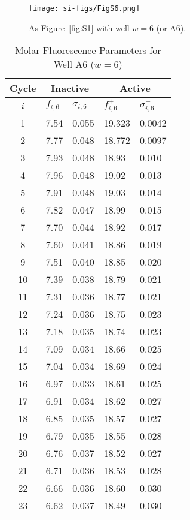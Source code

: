                 \begin{figure}
                    \centering
                    \texttt{[image: si-figs/FigS6.png]}
                    \caption{
                        As Figure~\ref{fig:S1} with well $w=6$ (or A6).
                    }
                \end{figure}
                \clearpage
    \begin{table}
        \caption{Molar Fluorescence Parameters for Well A6 ($w=6$)}
        \centering
        \begin{tabular}{c|ll|ll}
            Cycle & \multicolumn{2}{c|}{Inactive} & \multicolumn{2}{c}{Active} \\
            \hline
            $i$ & $f_{i,6}^{-}$ & $\sigma_{i,6}^{-}$ &  $f_{i,6}^{+}$ & $\sigma_{i,6}^{+}$ \\
            \hline
    1 & 7.54 & 0.055 & 19.323 & 0.0042 \\
2 & 7.77 & 0.048 & 18.772 & 0.0097 \\
3 & 7.93 & 0.048 & 18.93 & 0.010 \\
4 & 7.96 & 0.048 & 19.02 & 0.013 \\
5 & 7.91 & 0.048 & 19.03 & 0.014 \\
6 & 7.82 & 0.047 & 18.99 & 0.015 \\
7 & 7.70 & 0.044 & 18.92 & 0.017 \\
8 & 7.60 & 0.041 & 18.86 & 0.019 \\
9 & 7.51 & 0.040 & 18.85 & 0.020 \\
10 & 7.39 & 0.038 & 18.79 & 0.021 \\
11 & 7.31 & 0.036 & 18.77 & 0.021 \\
12 & 7.24 & 0.036 & 18.75 & 0.023 \\
13 & 7.18 & 0.035 & 18.74 & 0.023 \\
14 & 7.09 & 0.034 & 18.66 & 0.025 \\
15 & 7.04 & 0.034 & 18.69 & 0.024 \\
16 & 6.97 & 0.033 & 18.61 & 0.025 \\
17 & 6.91 & 0.034 & 18.62 & 0.027 \\
18 & 6.85 & 0.035 & 18.57 & 0.027 \\
19 & 6.79 & 0.035 & 18.55 & 0.028 \\
20 & 6.76 & 0.037 & 18.52 & 0.027 \\
21 & 6.71 & 0.036 & 18.53 & 0.028 \\
22 & 6.66 & 0.036 & 18.60 & 0.030 \\
23 & 6.62 & 0.037 & 18.49 & 0.030 \\

\end{tabular}
\end{table}
